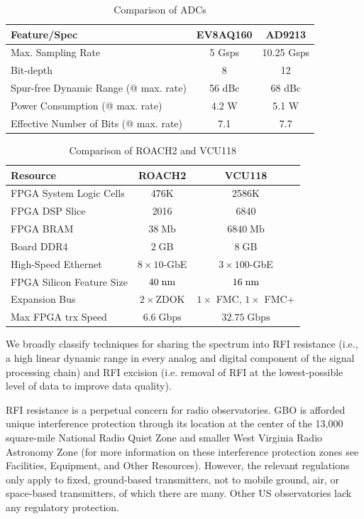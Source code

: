 \documentclass[10pt]{myNSF}
\begin{document}
\begin{table}[t]
  \centering
  \caption{Comparison of ADCs \label{table:adcs}}
  \begin{tabular}{|l|c|c|}
    \hline
    Feature/Spec & EV8AQ160 & AD9213 \\
    \hline
    Max. Sampling Rate & 5 Gsps & 10.25 Gsps \\
    Bit-depth & 8 & 12 \\
    Spur-free Dynamic Range (@ max. rate) & 56 dBc & 68 dBc \\
    Power Consumption (@ max. rate) & 4.2 W & 5.1 W \\
    Effective Number of Bits (@ max. rate) & 7.1 & 7.7 \\
    \hline
  \end{tabular}
\end{table}
\begin{table}[t]
  \centering
  \caption{Comparison of ROACH2 and VCU118 \label{table:fpgas}}
  \begin{tabular}{|l|c|c|}
    \hline
    Resource & ROACH2 & VCU118 \\
    \hline
    FPGA System Logic Cells & 476K & 2586K \\
    FPGA DSP Slice & 2016 & 6840 \\
    FPGA BRAM & $38\; \mathrm{Mb}$ & $6840\; \mathrm{Mb}$ \\
    Board DDR4 & $2\; \mathrm{GB}$ & $8\; \mathrm{GB}$ \\
    High-Speed Ethernet & $8 \times 10$-GbE & $3 \times 100$-GbE \\
    FPGA Silicon Feature Size & $40\; \textrm{nm}$ & $16\; \textrm{nm}$ \\
    Expansion Bus & $2 \times \mathrm{ZDOK}$ & $1 \times$ FMC, $1 \times$ FMC+ \\
    Max FPGA trx Speed & $6.6\; \mathrm{Gbps}$ & $32.75\; \mathrm{Gbps}$ \\
    \hline
  \end{tabular}
\end{table}

\label{sec:spectrum}

We broadly classify techniques for sharing the spectrum into RFI
resistance (i.e., a high linear dynamic range in every analog and
digital component of the signal processing chain) and RFI excision
(i.e. removal of RFI at the lowest-possible level of data to improve
data quality).

 RFI resistance is a perpetual concern for
radio observatories.  GBO is afforded unique interference protection
through its location at the center of the 13,000 square-mile National
Radio Quiet Zone and smaller West Virginia Radio Astronomy Zone (for
more information on these interference protection zones see
Facilities, Equipment, and Other Resources).  However, the relevant
regulations only apply to fixed, ground-based transmitters, not to
mobile ground, air, or space-based transmitters, of which there are
many.  Other US observatories lack any regulatory protection.
\end{document}
